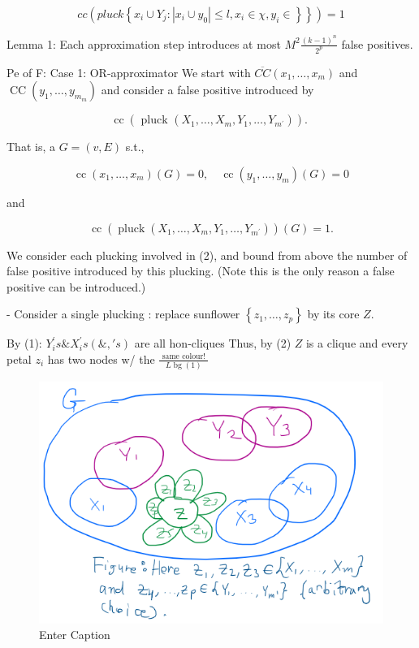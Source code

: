 $$
\left.c c\left(p l u c k\left\{x_i \cup Y_j:\left|x_i \cup y_0\right| \leq l, x_i \in \chi, y_i \in\right\}\right\}\right)=1
$$




Lemma 1: Each approximation step introduces at most $M^2 \frac{(k-1)^n}{2^p}$ false positives.

Pe of F: Case 1: OR-approximator
We start with $\overline{C C}\left(x_1, \ldots, x_m\right)$ and $\operatorname{CC}\left(y_1, \ldots, y_{m_m}\right)$ and consider a false positive introduced by

$$
\operatorname{cc}\left(\text { pluck }\left(X_1, \ldots, X_m, Y_1, \ldots, Y_{m^{\prime}}\right)\right) \text {. }
$$


That is, a $G=(v, E)$ s.t.,

$$
\operatorname{cc}\left(x_1, \ldots, x_m\right)(G)=0, \quad \operatorname{cc}\left(y_1, \ldots, y_m\right)(G)=0
$$

and

$$
\operatorname{cc}\left(\operatorname{pluck}\left(X_1, \ldots, X_m, Y_1, \ldots, Y_{m^{\prime}}\right)\right)(G)=1 .
$$


We consider each plucking involved in (2), and bound from above the number of false positive introduced by this plucking. (Note this is the only reason a false positive can be introduced.)


 - Consider a single plucking : replace sunflower $\left\{z_1, \ldots, z_p\right\}$ by its core $Z$.

By (1): $Y_i^{\prime} s \& X_i^{\prime} s(\&, ' s)$
are all hon-cliques
Thus, by (2)
$Z$ is a clique
and every petal $z_i$
has two nodes w/ the $\frac{\text { same colour! }}{L \operatorname{bg}(1)}$



\begin{figure}[H]
    \centering
    \includegraphics[width=.6\linewidth]{images/clique3.png}
    \caption{Enter Caption}
    \label{fig:enter-label}
\end{figure}


